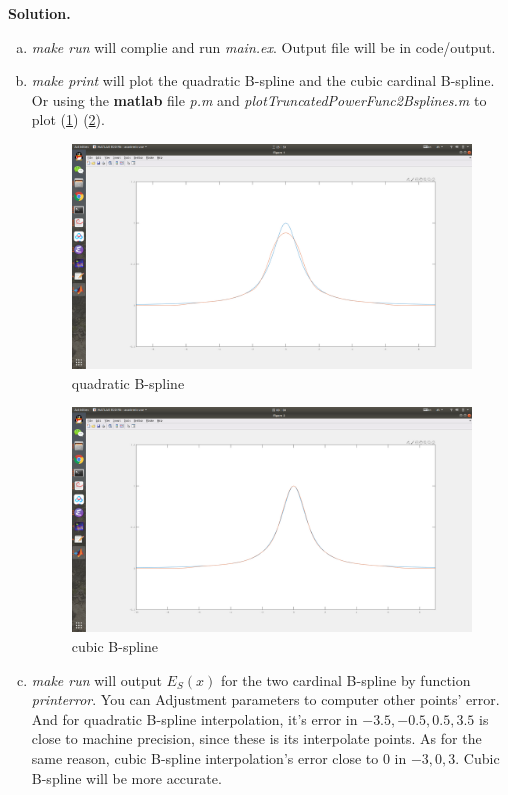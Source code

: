 \documentclass[a4paper]{book}
\newenvironment{solution}%
{\noindent\textbf{Solution.}}%
{\qedhere}
\numberwithin{equation}{chapter}
\theoremstyle{definition}
\begin{document}
\begin{solution}
  \begin{enumerate}[(a)]
  \item \textit{make run} will complie and run \textit{main.ex}. Output file will be in code/output.

  \item \textit{make print} will plot the quadratic B-spline and the cubic cardinal B-spline.
    Or using the \textbf{matlab} file \textit{p.m} and \textit{plotTruncatedPowerFunc2Bsplines.m} to plot (\ref{fig:1}) (\ref{fig:2}).

    \begin{figure}
      \centering
      \includegraphics[scale = 0.25]{quadraticBspline}
      \caption{quadratic B-spline}\label{fig:1}
    \end{figure}
    \begin{figure}
      \centering
      \includegraphics[scale = 0.25]{cubicBspline}
      \caption{cubic B-spline}\label{fig:2}
    \end{figure}

  \item \textit{make run} will output $E_S(x)$ for the two cardinal B-spline by function \textit{printerror}. You can Adjustment parameters to computer other points' error. And for quadratic B-spline interpolation, it's error in $-3.5, -0.5, 0.5, 3.5$ is close to machine precision, since these is its interpolate points. As for the same reason, cubic B-spline interpolation's error close to $0$ in $-3, 0, 3$. Cubic B-spline will be more accurate.


\end{enumerate}
\end{solution}
\end{document}
